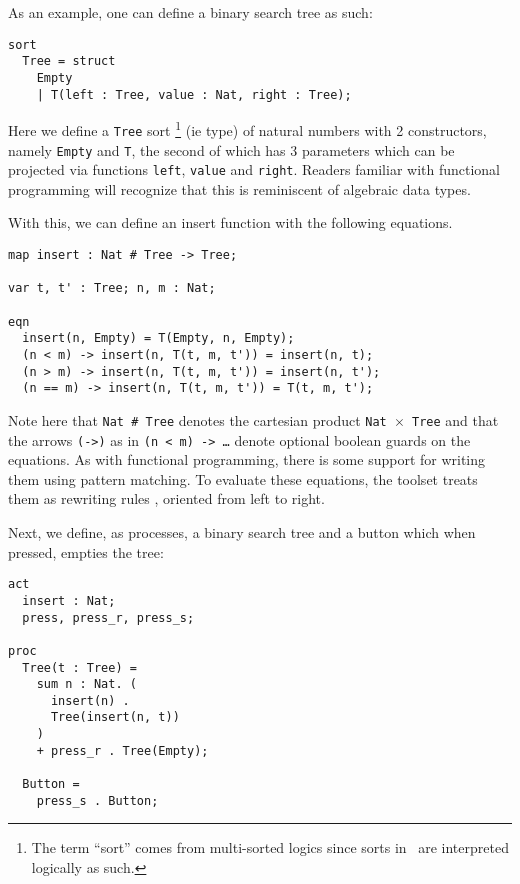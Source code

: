 \documentclass{article}
\begin{document}
As an example, one can define a binary search tree as such:
\begin{lstlisting}
sort
  Tree = struct
    Empty
    | T(left : Tree, value : Nat, right : Tree);
\end{lstlisting}
Here we define a \texttt{Tree} sort
\footnote{
  The term ``sort'' comes from multi-sorted logics since sorts in \mcrl \,
  are interpreted logically as such. 
}
(ie type) of natural numbers with 2
constructors, namely \texttt{Empty} and \texttt{T}, the second of which has 3
parameters which can be projected via functions \texttt{left}, \texttt{value}
and \texttt{right}.
Readers familiar with functional programming will recognize that this is
reminiscent of algebraic data types.

With this, we can define an insert function with the following equations.

\begin{lstlisting}
map insert : Nat # Tree -> Tree;

var t, t' : Tree; n, m : Nat;

eqn
  insert(n, Empty) = T(Empty, n, Empty);
  (n < m) -> insert(n, T(t, m, t')) = insert(n, t);
  (n > m) -> insert(n, T(t, m, t')) = insert(n, t');
  (n == m) -> insert(n, T(t, m, t')) = T(t, m, t');
\end{lstlisting}

Note here that \texttt{Nat \# Tree} denotes the cartesian product
\texttt{Nat $\times$ Tree} and that the arrows \texttt{(->)} as in
\texttt{(n < m) -> \dots} denote optional boolean guards on the equations.
As with functional programming, there is some support for writing them using
pattern matching.
To evaluate these equations, the toolset treats them as rewriting rules
\cite{mcrl_rewriting}, oriented from left to right.

Next, we define, as processes, a binary search tree and a button which
when pressed, empties the tree:

\begin{lstlisting}
act
  insert : Nat;
  press, press_r, press_s;

proc
  Tree(t : Tree) =
    sum n : Nat. (
      insert(n) .
      Tree(insert(n, t))
    )
    + press_r . Tree(Empty);

  Button =
    press_s . Button;
\end{lstlisting}
\end{document}
